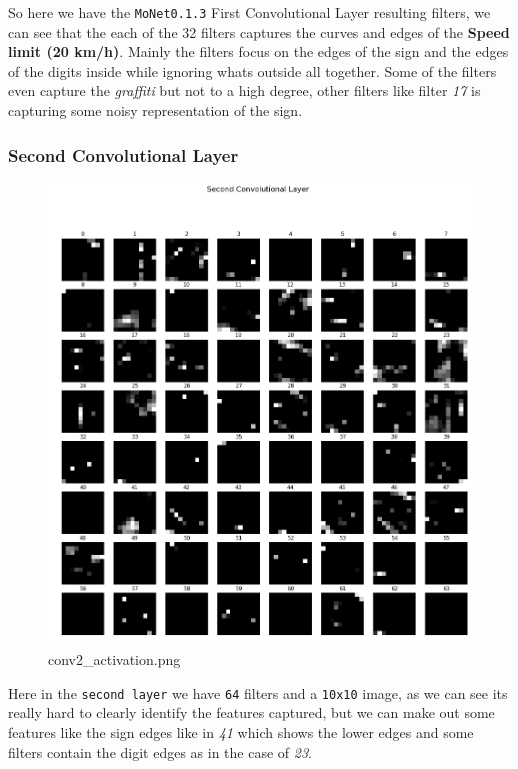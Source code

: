 \documentclass[11pt]{article}
\makeatletter
\def\maxwidth{\ifdim\Gin@nat@width>\linewidth\linewidth
    \else\Gin@nat@width\fi}
\let\Oldincludegraphics\includegraphics
\renewcommand{\includegraphics}[1]{\Oldincludegraphics[width=.8\maxwidth]{#1}}
\makeatother
\begin{document}
So here we have the \texttt{MoNet0.1.3} First Convolutional Layer
resulting filters, we can see that the each of the 32 filters captures
the curves and edges of the \textbf{Speed limit (20 km/h)}. Mainly the
filters focus on the edges of the sign and the edges of the digits
inside while ignoring whats outside all together. Some of the filters
even capture the \emph{graffiti} but not to a high degree, other filters
like filter \emph{17} is capturing some noisy representation of the
sign.

\hypertarget{second-convolutional-layer}{%
\subsubsection{Second Convolutional
Layer}\label{second-convolutional-layer}}

\begin{figure}
\centering
\includegraphics{./assets/conv2.png}
\caption{conv2\_activation.png}
\end{figure}

Here in the \texttt{second\ layer} we have \texttt{64} filters and a
\texttt{10x10} image, as we can see its really hard to clearly identify
the features captured, but we can make out some features like the sign
edges like in \emph{41} which shows the lower edges and some filters
contain the digit edges as in the case of \emph{23}.
\end{document}
